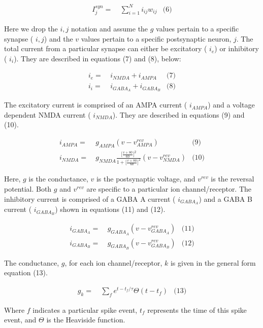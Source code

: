 \begin{align*} I_{j}^{syn} = & ~ \sum \limits_{i=1}^{N} i_{ij}w_{ij} & \text{(6)} \end{align*}

Here we drop the $i,j$ notation and assume the $g$ values pertain to a specific synapse ( $i,j$) and the $v$ values pertain to a specific postsynaptic neuron, $j$. The total current from a particular synapse can either be excitatory ( $i_{e}$) or inhibitory ( $i_{i}$). They are described in equations (7) and (8), below\+:

\begin{align*} i_{e} = & ~ i_{NMDA} + i_{AMPA} & \text{(7)} \\ i_{i} = & ~ i_{GABA_{A}} + i_{GABA_{B}} & \text{(8)} \end{align*}

The excitatory current is comprised of an A\+M\+PA current ( $i_{AMPA}$) and a voltage dependent N\+M\+DA current ( $i_{NMDA}$). They are described in equations (9) and (10).

\begin{align*} i_{AMPA} = & ~ g_{AMPA}(v-v^{rev}_{AMPA}) & \text{(9)} \\ i_{NMDA} = & ~ g_{NMDA}\frac{\Big[\frac{v+80}{60} \Big]^{2}}{1+\Big[\frac{v+80}{60} \Big]^{2}} (v-v^{rev}_{NMDA}) & \text{(10)} \end{align*}

Here, $g$ is the conductance, $v$ is the postsynaptic voltage, and $v^{rev}$ is the reversal potential. Both $g$ and $v^{rev}$ are specific to a particular ion channel/receptor. The inhibitory current is comprised of a G\+A\+BA A current ( $i_{GABA_A}$) and a G\+A\+BA B current ( $i_{GABA_B}$) shown in equations (11) and (12).

\begin{align*} i_{GABA_{A}} = & ~ g_{GABA_{A}}(v-v^{rev}_{GABA_{A}}) & \text{(11)} \\ i_{GABA_{B}} = & ~ g_{GABA_{B}}(v-v^{rev}_{GABA_{B}}) & \text{(12)} \end{align*}

The conductance, $g$, for each ion channel/receptor, $k$ is given in the general form equation (13).

\begin{align*} g_{k} = & ~ \sum \limits_{f} e^{t-t_{f}/ \tau} \Theta(t-t_f) & \text{(13)} \end{align*}

Where $f$ indicates a particular spike event, $t_f$ represents the time of this spike event, and $ \Theta $ is the Heaviside function.

